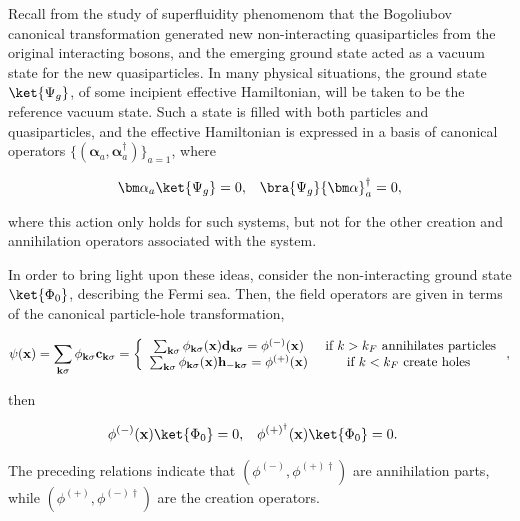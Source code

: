 Recall from the study of superfluidity phenomenom that the Bogoliubov canonical transformation generated new non-interacting quasiparticles from the original interacting bosons, and the emerging ground state acted as a vacuum state for the new quasiparticles. 
In many physical situations, the ground state $\ket{\Psi_g}$, of some incipient effective Hamiltonian, will be taken to be the reference vacuum state. Such a state is filled with both particles and quasiparticles, and the effective Hamiltonian is expressed in a basis of canonical operators $\bigg\{({\bm \alpha}_{a}, {\bm \alpha}^\dagger_{a})\bigg\}_{a = 1}$, where 

\begin{align}
    {\bm \alpha}_{a} \ket{\Psi_g} &= 0, & \bra{\Psi_g} {\bm \alpha}_{a}^\dagger = 0,
\end{align}

where this action only holds for such systems, but not for the other creation and annihilation operators associated with the system. \\

\begin{tcolorbox}[colback = yellow, title = Physical Context]

In order to bring light upon these ideas, consider the non-interacting ground state $\ket{\Phi_0}$, describing the Fermi sea. Then, the field operators are given in terms of the canonical particle-hole transformation,

\begin{equation}
    \psi({\bf x}) = \sum_{{\bf k} \sigma} \phi_{{\bf k} \sigma} {\bf c}_{{\bf k} \sigma} = \left\{\begin{array}{cc}
       \sum_{{\bf k} \sigma} \phi_{{\bf k} \sigma}({\bf x}) {\bf d}_{{\bf k} \sigma} = \phi^{(-)}({\bf x}) & \textnormal{ if $k > k_F$ annihilates particles}{} \\
       \sum_{{\bf k} \sigma} \phi_{{\bf k} \sigma}({\bf x}) {\bf h}_{-{\bf k} \sigma} = \phi^{(+)}({\bf x}) & \textnormal{ if $k < k_F$ create holes }{}
    \end{array}\right.,
\end{equation}

then 

\begin{align}
    \phi^{(-)}({\bf x}) \ket{\Phi_0} &= 0, & \phi^{(+)^\dagger}({\bf x}) \ket{\Phi_0} &= 0.
\end{align}

The preceding relations indicate that $(\phi^{(-)}, \phi^{(+)\dagger})$ are annihilation parts, while $(\phi^{(+)}, \phi^{(-)\dagger})$ are the creation operators. 

\end{tcolorbox}

